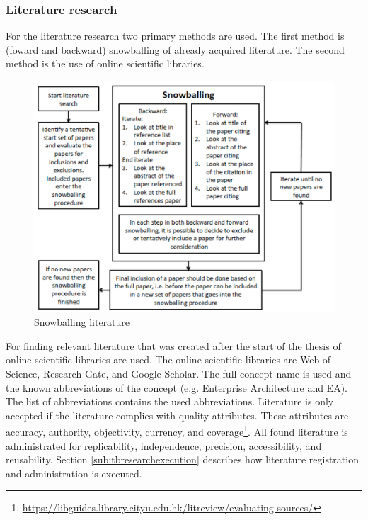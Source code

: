 \subsubsection{Literature research}
For the literature research two primary methods are used. The first method is (foward and backward) snowballing of already acquired literature. The second method is the use of online scientific libraries.

\begin{figure}[H]
	\centering
	\includegraphics[width=0.6\linewidth]{images/snowball}
	\caption[Snowballing literature]{Snowballing literature \parencite{Botjes2021a}}
	\label{fig:snowball}
\end{figure}

For finding relevant literature that was created after the start of the thesis of \citeauthor{Botjes2020} online scientific libraries are used. The online scientific libraries are Web of Science, Research Gate, and Google Scholar. The full concept name is used and the known abbreviations of the concept (e.g. Enterprise Architecture and EA). The list of abbreviations contains the used abbreviations. Literature is only accepted if the literature complies with quality attributes. These attributes are accuracy, authority, objectivity, currency, and coverage\footnote{\url{https://libguides.library.cityu.edu.hk/litreview/evaluating-sources/}}. All found literature is administrated for replicability, independence, precision, accessibility, and reusability. Section \ref{sub:tbresearchexecution} describes how literature registration and administration is executed.

